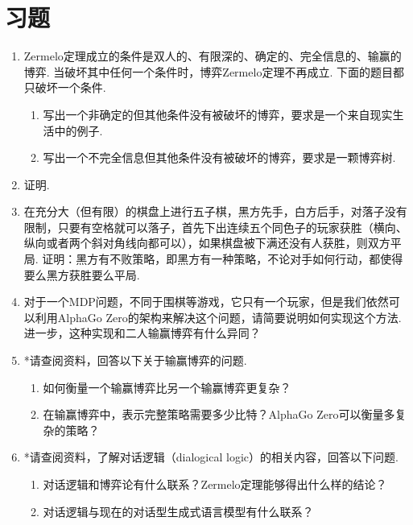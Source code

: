 \section{习题}
\begin{enumerate}[wide, labelindent=0pt]
    \item \label{exercise:zermelo-fail} Zermelo定理成立的条件是双人的、有限深的、确定的、完全信息的、输赢的博弈. 当破坏其中任何一个条件时，博弈Zermelo定理不再成立. 下面的题目都只破坏一个条件.
    \begin{enumerate}
        \item 写出一个非确定的但其他条件没有被破坏的博弈，要求是一个来自现实生活中的例子.
        \item 写出一个不完全信息但其他条件没有被破坏的博弈，要求是一颗博弈树.
    \end{enumerate}

    \item \label{exercise:zermelo-draw} 证明.

    \item \label{exercise:gomoku} 在充分大（但有限）的棋盘上进行五子棋，黑方先手，白方后手，对落子没有限制，只要有空格就可以落子，首先下出连续五个同色子的玩家获胜（横向、纵向或者两个斜对角线向都可以），如果棋盘被下满还没有人获胜，则双方平局. 证明：黑方有不败策略，即黑方有一种策略，不论对手如何行动，都使得要么黑方获胜要么平局.
    
    \item 对于一个MDP问题，不同于围棋等游戏，它只有一个玩家，但是我们依然可以利用AlphaGo Zero的架构来解决这个问题，请简要说明如何实现这个方法. 进一步，这种实现和二人输赢博弈有什么异同？
    
    \item *请查阅资料，回答以下关于输赢博弈的问题. 
    \begin{enumerate}
        \item 如何衡量一个输赢博弈比另一个输赢博弈更复杂？
        \item 在输赢博弈中，表示完整策略需要多少比特？AlphaGo Zero可以衡量多复杂的策略？
    \end{enumerate}
    
    \item *请查阅资料，了解对话逻辑（dialogical logic）的相关内容，回答以下问题. 
    \begin{enumerate}
        \item 对话逻辑和博弈论有什么联系？Zermelo定理能够得出什么样的结论？
        \item 对话逻辑与现在的对话型生成式语言模型有什么联系？
    \end{enumerate}
    

\end{enumerate}
